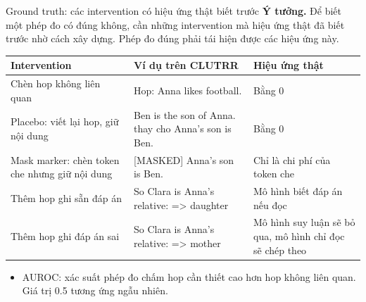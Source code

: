 \documentclass[aspectratio=169,t,10pt]{beamer}
\newcommand{\ex}[1]{{\ttfamily\footnotesize #1}}
\begin{document}
\begin{frame}[shrink]{Ground truth: các intervention có hiệu ứng thật biết trước}
\small
\textbf{Ý tưởng.} Để biết một phép đo có đúng không, cần những intervention mà hiệu ứng thật đã biết trước nhờ cách xây dựng. Phép đo đúng phải tái hiện được các hiệu ứng này.\par
\vspace{4pt}
\footnotesize
\renewcommand{\arraystretch}{1.3}
\begin{tabularx}{\textwidth}{@{}P{3.0cm}YP{3.1cm}@{}}
\toprule
\textbf{Intervention} & \textbf{Ví dụ trên CLUTRR} & \textbf{Hiệu ứng thật}\\
\midrule
Chèn hop không liên quan & \ex{Hop: Anna likes football.} & Bằng 0\\
Placebo: viết lại hop, giữ nội dung & \ex{Ben is the son of Anna.} thay cho \ex{Anna's son is Ben.} & Bằng 0\\
Mask marker: chèn token che nhưng giữ nội dung & \ex{[MASKED] Anna's son is Ben.} & Chỉ là chi phí của token che\\
Thêm hop ghi sẵn đáp án & \ex{So Clara is Anna's relative: => daughter} & Mô hình biết đáp án nếu đọc\\
Thêm hop ghi đáp án sai & \ex{So Clara is Anna's relative: => mother} & Mô hình suy luận sẽ bỏ qua, mô hình chỉ đọc sẽ chép theo\\
\bottomrule
\end{tabularx}
\small
\begin{itemize}
  \item AUROC: xác suất phép đo chấm hop cần thiết cao hơn hop không liên quan. Giá trị 0.5 tương ứng ngẫu nhiên.
\end{itemize}
\end{frame}
\end{document}
